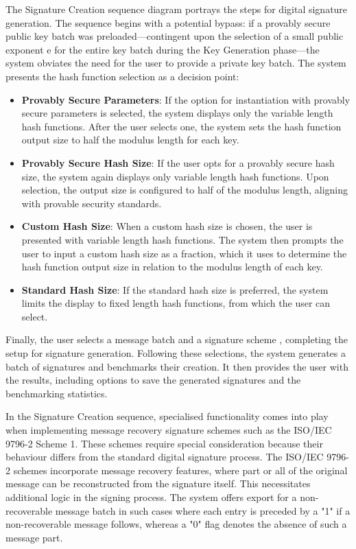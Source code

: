 \documentclass[]{final_report}
\theoremstyle{definition}
\begin{document}
The Signature Creation sequence diagram portrays the steps for digital signature generation. The sequence begins with a potential bypass: if a provably secure public key batch was preloaded—contingent upon the selection of a small public exponent e for the entire key batch during the Key Generation phase—the system obviates the need for the user to provide a private key batch.
The system presents the hash function selection as a decision point:
\begin{itemize}
    \item \textbf{Provably Secure Parameters}: If the option for instantiation with provably secure parameters is selected, the system displays only the variable length hash functions. After the user selects one, the system sets the hash function output size to half the modulus length for each key.
    \item \textbf{Provably Secure Hash Size}: If the user opts for a provably secure hash size, the system again displays only variable length hash functions. Upon selection, the output size is configured to half of the modulus length, aligning with provable security standards.
    \item \textbf{Custom Hash Size}: When a custom hash size is chosen, the user is presented with variable length hash functions. The system then prompts the user to input a custom hash size as a fraction, which it uses to determine the hash function output size in relation to the modulus length of each key.
    \item \textbf{Standard Hash Size}: If the standard hash size is preferred, the system limits the display to fixed length hash functions, from which the user can select.
\end{itemize}

Finally, the user selects a message batch and a signature scheme , completing the setup for signature generation. Following these selections, the system generates a batch of signatures and benchmarks their creation. It then provides the user with the results, including options to save the generated signatures and the benchmarking statistics. 

In the Signature Creation sequence, specialised functionality comes into play when implementing message recovery signature schemes such as the ISO/IEC 9796-2 Scheme 1. These schemes require special consideration because their behaviour differs from the standard digital signature process. The ISO/IEC 9796-2 schemes incorporate message recovery features, where part or all of the original message can be reconstructed from the signature itself. This necessitates additional logic in the signing process. The system offers export for a non-recoverable message batch in such cases where each entry is preceded by a "1" if a non-recoverable message follows, whereas a "0" flag denotes the absence of such a message part.
\end{document}
